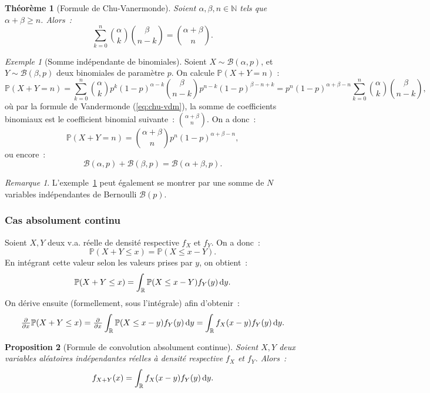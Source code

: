\documentclass{article}
\newcommand{\N}{\mathbb N}
\renewcommand{\P}{\mathbb P}
\newcommand{\R}{\mathbb R}
\newtheorem{thm}{Théorème}[section]
\newtheorem{prp}[thm]{Proposition}
\theoremstyle{definition}
\theoremstyle{remark}
\newtheorem*{rmq}{Remarque}
\newtheorem{ex}{Exemple}
\begin{document}
		\begin{thm}[Formule de Chu-Vanermonde] Soient $\alpha, \beta, n \in \N$ tels que $\alpha + \beta \geq n$. Alors~:
		\begin{equation}\label{eq:chu-vdm}
			\sum_{k=0}^n\binom \alpha k\binom \beta{n-k} = \binom {\alpha+\beta}n.
		\end{equation}
		\end{thm}

		\begin{ex}[Somme indépendante de binomiales]\label{ex:sommeindébinom} Soient $X \sim \mathcal B(\alpha, p)$, et $Y \sim \mathcal B(\beta, p)$ deux
		binomiales de paramètre $p$. On calcule $\P(X+Y = n)$ :
		\[\P(X+Y = n) = \sum_{k=0}^n\binom \alpha kp^k(1-p)^{\alpha-k}\binom \beta{n-k}p^{n-k}(1-p)^{\beta-n+k}
		= p^n(1-p)^{\alpha+\beta-n}\sum_{k=0}^n\binom \alpha k\binom \beta{n-k},\]
		où par la formule de Vandermonde (\eqref{eq:chu-vdm}), la somme de coefficients binomiaux est le coefficient binomial suivante~: $\binom {\alpha+\beta}n$.
		On a donc~:
		\[\P(X+Y = n) = \binom {\alpha+\beta}np^n(1-p)^{\alpha+\beta-n},\]
		ou encore~:
		\[\mathcal B(\alpha, p) + \mathcal B(\beta, p) = \mathcal B(\alpha+\beta, p).\]
		\end{ex}

		\begin{rmq} L'exemple~\ref{ex:sommeindébinom} peut également se montrer par une somme de $N$ variables indépendantes de Bernoulli $\mathcal B(p)$.
		\end{rmq}

		\subsubsection{Cas absolument continu}
		Soient $X, Y$ deux v.a. réelle de densité respective $f_X$ et $f_Y$. On a donc~:
		\[\P(X+Y \leq x) = \P(X \leq x - Y).\]
		En intégrant cette valeur selon les valeurs prises par $y$, on obtient~:
		\[\P(X+Y \leq x) = \int_\R \P(X \leq x - Y)f_Y(y)\dif y.\]
		On dérive ensuite (formellement, sous l'intégrale) afin d'obtenir~:
		\[\pd {}x\P(X+Y \leq x) = \pd {}x\int_\R \P(X \leq x - y)f_Y(y)\dif y = \int_\R f_X(x-y)f_Y(y)\dif y.\]

		\begin{prp}[Formule de convolution absolument continue] Soient $X, Y$ deux variables aléatoires indépendantes réelles à densité respective $f_X$ et
		$f_Y$. Alors~:
		\begin{equation}\label{eq:convabscont}
			f_{X+Y}(x) = \int_\R f_X(x-y)f_Y(y)\dif y.
		\end{equation}
		\end{prp}
\end{document}

